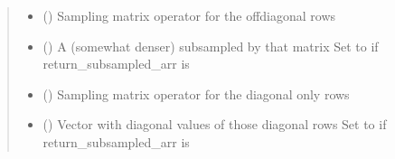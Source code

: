 \documentclass[letterpaper,10pt,english]{sphinxmanual}
\begin{document}
\begin{fulllineitems}
\begin{quote}
\begin{description}
\sphinxAtStartPar
\begin{itemize}
\item {}
\sphinxAtStartPar
{} () \textendash{} Sampling matrix operator for the off\sphinxhyphen{}diagonal rows

\item {}
\sphinxAtStartPar
{} () \textendash{} A (somewhat denser) subsampled by that matrix
Set to  if return\_subsampled\_arr is 

\item {}
\sphinxAtStartPar
{} () \textendash{} Sampling matrix operator for the diagonal only rows

\item {}
\sphinxAtStartPar
{} () \textendash{} Vector with diagonal values of those diagonal rows
Set to  if return\_subsampled\_arr is 

\end{itemize}


\end{description}\end{quote}

\end{fulllineitems}

\end{document}
